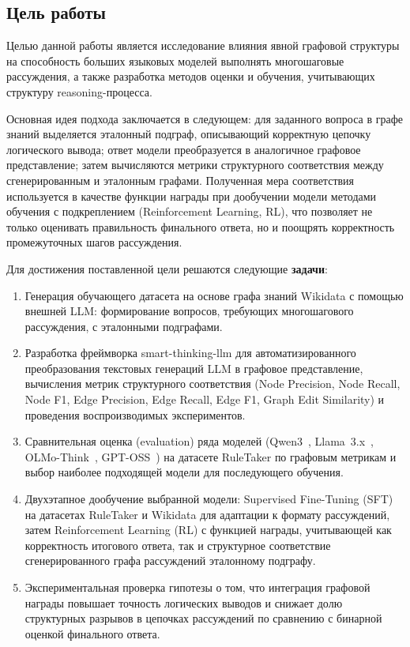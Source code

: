\subsection{Цель работы}
\label{subsec:goal}

Целью данной работы является исследование влияния явной графовой структуры на способность больших языковых моделей выполнять многошаговые рассуждения, а также разработка методов оценки и обучения, учитывающих структуру reasoning-процесса.

Основная идея подхода заключается в следующем: для заданного вопроса в графе знаний выделяется эталонный подграф, описывающий корректную цепочку логического вывода; ответ модели преобразуется в аналогичное графовое представление; затем вычисляются метрики структурного соответствия между сгенерированным и эталонным графами. Полученная мера соответствия используется в качестве функции награды при дообучении модели методами обучения с подкреплением (Reinforcement Learning, RL), что позволяет не только оценивать правильность финального ответа, но и поощрять корректность промежуточных шагов рассуждения.

Для достижения поставленной цели решаются следующие \textbf{задачи}:
\begin{enumerate}
    \item Генерация обучающего датасета на основе графа знаний Wikidata с помощью внешней LLM: формирование вопросов, требующих многошагового рассуждения, с эталонными подграфами.
    \item Разработка фреймворка smart-thinking-llm для автоматизированного преобразования текстовых генераций LLM в графовое представление, вычисления метрик структурного соответствия (Node Precision, Node Recall, Node F1, Edge Precision, Edge Recall, Edge F1, Graph Edit Similarity) и проведения воспроизводимых экспериментов.
    \item Сравнительная оценка (evaluation) ряда моделей (Qwen3~\cite{yang2025qwen3}, Llama~3.x~\cite{touvron2023llama}, OLMo-Think~\cite{groeneveld2024olmo}, GPT-OSS~\cite{openai2023gpt4}) на датасете RuleTaker по графовым метрикам и выбор наиболее подходящей модели для последующего обучения.
    \item Двухэтапное дообучение выбранной модели: Supervised Fine-Tuning (SFT) на датасетах RuleTaker и Wikidata для адаптации к формату рассуждений, затем Reinforcement Learning (RL) с функцией награды, учитывающей как корректность итогового ответа, так и структурное соответствие сгенерированного графа рассуждений эталонному подграфу.
    \item Экспериментальная проверка гипотезы о том, что интеграция графовой награды повышает точность логических выводов и снижает долю структурных разрывов в цепочках рассуждений по сравнению с бинарной оценкой финального ответа.
\end{enumerate}

